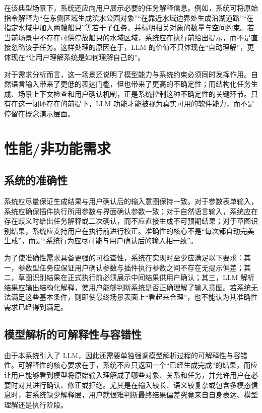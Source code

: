 \documentclass[UTF8,a4paper,10pt]{ctexart}
\begin{document}
在该典型场景下，系统还应向用户展示必要的任务解释信息。例如，系统可将原始指令解释为“在东侧区域生成滨水公园对象”“在靠近水域边界处生成沿湖道路”“在指定水域中加入两艘船只”等若干子任务，并标明相关对象的数量与空间约束。若当前场景中不存在可供停放船只的水域区域，系统应在执行前给出提示，而不是直接忽略该子任务。这样处理的原因在于，LLM 的价值不只体现在“自动理解”，更体现在“让用户理解系统是如何理解自己的”。

对于需求分析而言，这一场景还说明了模型能力与系统约束必须同时发挥作用。自然语言输入带来了更低的表达门槛，但也带来了更高的不确定性；而结构化任务生成、场景上下文检查和用户确认机制，正是系统控制这种不确定性的关键环节。只有在这一闭环存在的前提下，LLM 功能才能被视为真实可用的软件能力，而不是停留在概念演示层面。

\section{性能/非功能需求}

\subsection{系统的准确性}
系统应尽量保证生成结果与用户确认后的输入意图保持一致。对于参数表单输入，系统应确保插件执行所用参数与界面确认参数一致；对于自然语言输入，系统应在存在歧义时给出任务解释或二次确认，而不应直接生成不可预期结果；对于草图识别结果，系统应支持用户在执行前进行校正。准确性的核心不是“每次都自动完美生成”，而是“系统行为应尽可能与用户确认后的输入相一致”。

为了使准确性需求具备更强的可检查性，系统在实现时至少应满足以下要求：其一，参数型任务应保证用户确认参数与插件执行参数之间不存在无提示偏差；其二，草图识别结果在正式执行前必须展示中间结果供用户确认；其三，LLM 解析结果应输出结构化解释，使用户能够判断系统是否正确理解了输入意图。若系统无法满足这些基本条件，则即使最终场景表面上“看起来合理”，也不能认为其准确性需求已经得到满足。

\subsection{模型解析的可解释性与容错性}
由于本系统引入了 LLM，因此还需要单独强调模型解析过程的可解释性与容错性。可解释性的核心要求在于，系统不应只返回一个“已经生成完成”的结果，而应让用户能够看到模型将原始输入理解成了哪些对象、关系和任务，并允许用户在必要时对其进行确认、修正或拒绝。尤其是在输入较长、语义较复杂或包含多模态信息时，若系统缺少解释层，用户就很难判断最终结果偏差究竟来自自身表达、模型理解还是执行阶段。
\end{document}
